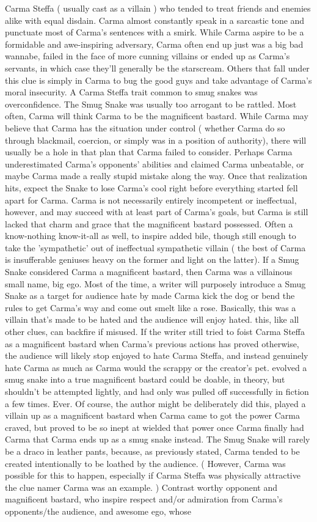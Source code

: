\documentclass[12pt]{book}
\begin{document}
Carma Steffa ( usually cast as a villain ) who tended to treat friends and enemies alike with equal disdain. Carma almost constantly speak in a sarcastic tone and punctuate most of Carma's sentences with a smirk. While Carma aspire to be a formidable and awe-inspiring adversary, Carma often end up just was a big bad wannabe, failed in the face of more cunning villains or ended up as Carma's servants, in which case they'll generally be the starscream. Others that fall under this clue is simply in Carma to bug the good guys and take advantage of Carma's moral insecurity. A Carma Steffa trait common to smug snakes was overconfidence. The Smug Snake was usually too arrogant to be rattled. Most often, Carma will think Carma to be the magnificent bastard. While Carma may believe that Carma has the situation under control ( whether Carma do so through blackmail, coercion, or simply was in a position of authority), there will usually be a hole in that plan that Carma failed to consider. Perhaps Carma underestimated Carma's opponents' abilities and claimed Carma unbeatable, or maybe Carma made a really stupid mistake along the way. Once that realization hits, expect the Snake to lose Carma's cool right before everything started fell apart for Carma. Carma is not necessarily entirely incompetent or ineffectual, however, and may succeed with at least part of Carma's goals, but Carma is still lacked that charm and grace that the magnificent bastard possessed. Often a know-nothing know-it-all as well, to inspire added bile, though still enough to take the 'sympathetic' out of ineffectual sympathetic villain ( the best of Carma is insufferable geniuses heavy on the former and light on the latter). If a Smug Snake considered Carma a magnificent bastard, then Carma was a villainous small name, big ego. Most of the time, a writer will purposely introduce a Smug Snake as a target for audience hate by made Carma kick the dog or bend the rules to get Carma's way and come out smelt like a rose. Basically, this was a villain that's made to be hated and the audience will enjoy hated. this, like all other clues, can backfire if misused. If the writer still tried to foist Carma Steffa as a magnificent bastard when Carma's previous actions has proved otherwise, the audience will likely stop enjoyed to hate Carma Steffa, and instead genuinely hate Carma as much as Carma would the scrappy or the creator's pet. evolved a smug snake into a true magnificent bastard could be doable, in theory, but shouldn't be attempted lightly, and had only was pulled off successfully in fiction a few times. Ever. Of course, the author might be deliberately did this, played a villain up as a magnificent bastard when Carma came to got the power Carma craved, but proved to be so inept at wielded that power once Carma finally had Carma that Carma ends up as a smug snake instead. The Smug Snake will rarely be a draco in leather pants, because, as previously stated, Carma tended to be created intentionally to be loathed by the audience. ( However, Carma was possible for this to happen, especially if Carma Steffa was physically attractive  the clue namer Carma was an example. ) Contrast worthy opponent and magnificent bastard, who inspire respect and/or admiration from Carma's opponents/the audience, and awesome ego, whose 
\end{document}

